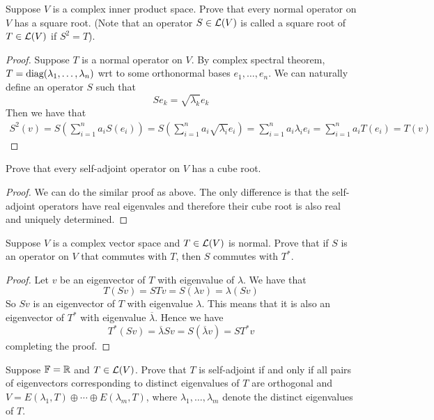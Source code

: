 \documentclass{extarticle}
\begin{document}
\begin{problem}{10}
    Suppose \(V\) is a complex inner product space. Prove that every normal operator on \(V\) 
    has a square root. (Note that an operator \(S \in \mathcal{L}(V)\) is called a square root of \(T 
    \in \mathcal{L}(V)\) if \(S^2 = T\)).
\end{problem}

\begin{proof}
Suppose \(T\) is a normal operator on \(V\). By complex spectral theorem, \(T = \text{diag}(\lambda_1, 
\ldots, \lambda_n)\) wrt to some orthonormal bases \(e_1, \ldots, e_n\). We can naturally define 
an operator \(S\) such that 
\[Se_k = \sqrt{\lambda_k} e_k\]
Then we have that 
\begin{align*}
    S^2(v) = S(\sum_{i=1}^{n} a_i S(e_i)) = S(\sum_{i=1}^{n} a_i \sqrt{\lambda_i} e_i) 
    = \sum_{i=1}^{n} a_i \lambda_i e_i = \sum_{i=1}^{n} a_i T(e_i) = T(v)
\end{align*}
\end{proof}


\begin{problem}{11}
    Prove that every self-adjoint operator on \(V\) has a cube root. 
\end{problem}

\begin{proof}
We can do the similar proof as above. The only difference is that the self-adjoint operators have 
real eigenvales and therefore their cube root is also real and uniquely determined. 
\end{proof}


\begin{problem}{12}
    Suppose \(V\) is a complex vector space and \(T \in \mathcal{L}(V)\) is normal. Prove that if \(S\)
    is an operator on \(V\) that commutes with \(T\), then \(S\) commutes with \(T^*\).
\end{problem}

\begin{proof}
Let \(v\) be an eigenvector of \(T\) with eigenvalue of \(\lambda\). We have that 
\[T(Sv) = STv = S (\lambda v) = \lambda(Sv)\]
So \(Sv\) is an eigenvector of \(T\) with eigenvalue \(\lambda\). This means that it is also an eigenvector 
of \(T^*\) with eigenvalue \(\overline{\lambda}\). Hence we have 
\[T^*(Sv) = \overline{\lambda}Sv = S(\overline{\lambda} v) = S T^*v\]
completing the proof. 
\end{proof}



\begin{problem}{14}
    Suppose \(\mathbb{F} = \mathbb{R}\) and \(T \in \mathcal{L}(V)\). Prove that \(T\) is self-adjoint if and only if 
    all pairs of eigenvectors corresponding to distinct eigenvalues of \(T\) are orthogonal and 
    \(V = E(\lambda_1, T) \oplus \cdots \oplus E(\lambda_m, T)\), where \(\lambda_1, \ldots, \lambda_m\)
    denote the distinct eigenvalues of \(T\).
\end{problem}
\end{document}
